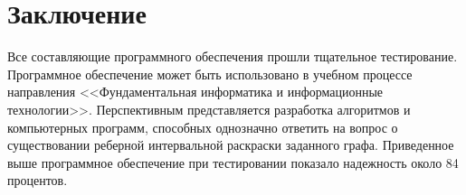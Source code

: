 \par\medskip

\section{Заключение}
Все составляющие программного обеспечения прошли тщательное тестирование. Программное обеспечение может быть использовано в учебном процессе направления <<Фундаментальная информатика и информационные технологии>>. Перспективным представляется разработка алгоритмов и компьютерных программ, способных однозначно ответить на вопрос о существовании реберной интервальной раскраски заданного графа. Приведенное выше программное обеспечение при тестировании показало надежность около 84 процентов.
